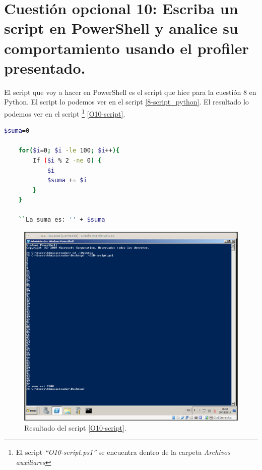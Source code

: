 \documentclass[a4paper,titlepage,12pt]{scrartcl}	%
\numberwithin{figure}{section} %
\numberwithin{table}{section} %
\begin{document}
	\section[Cuestión opcional 10: Escriba un script en PowerShell y analice su comportamiento usando el profiler presentado.]{Cuestión opcional 10: Escriba un script en PowerShell y analice su comportamiento usando el profiler presentado.}
	
	El script que voy a hacer en PowerShell es el script que hice para la cuestión 8 en Python. El script lo podemos ver en el script \ref{8-script_python}. El resultado lo podemos ver en el script \footnote{El script \textit{``O10-script.ps1''} se encuentra dentro de la carpeta \textit{Archivos auxiliares}} \ref{O10-script}.
	
	\begin{lstlisting}[language=bash, xleftmargin=-1cm, breaklines=true, basicstyle=\footnotesize,  label={O10-script}]
	$suma=0
	
	for($i=0; $i -le 100; $i++){
		If ($i % 2 -ne 0) {
			$i
			$suma += $i
		}
	}
	
	``La suma es: '' + $suma
	\end{lstlisting}
	
	\begin{figure}[H]
		\includegraphics[width=\linewidth]{./Imagenes/O10-resultado.png}
		\vspace{-0.5cm}
		\caption[Resultado del script \ref{O10-script}.]{Resultado del script \ref{O10-script}.}
		\label{O10-resultado}
	\end{figure}
	
\end{document}
